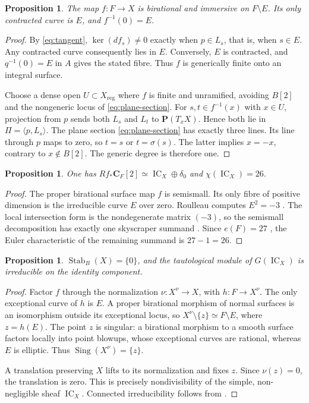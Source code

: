 \documentclass[10pt]{amsart}
\numberwithin{equation}{section}
\newtheorem{proposition}[theorem]{Proposition}
\theoremstyle{remark}
\newcommand{\CC}{\mathbf C}
\newcommand{\PP}{\mathbf P}
\newcommand{\IC}{\operatorname{IC}}
\newcommand{\Stab}{\operatorname{Stab}}
\newcommand{\Sing}{\operatorname{Sing}}
\newcommand{\reg}{\mathrm{reg}}
\begin{document}
\begin{proposition}\label{prop:birational}
The map $f:F\to X$ is birational and immersive on $F\setminus E$.
Its only contracted curve is $E$, and $f^{-1}(0)=E$.
\end{proposition}
\begin{proof}
By \eqref{eq:tangent}, $\ker(df_s)\ne0$ exactly when $p\in L_s$, that
is, when $s\in E$.  Any contracted curve consequently lies in $E$.
Conversely, $E$ is contracted, and $q^{-1}(0)=E$ in $A$ gives the stated
fibre.  Thus $f$ is generically finite onto an integral surface.

Choose a dense open $U\subset X_{\reg}$ where $f$ is finite and unramified,
avoiding $B[2]$ and the nongeneric locus of \eqref{eq:plane-section}.
For $s,t\in f^{-1}(x)$ with $x\in U$, projection from $p$ sends both
$L_s$ and $L_t$ to $\PP(T_xX)$.  Hence both lie in
$\Pi=\langle p,L_s\rangle$.  The plane section
\eqref{eq:plane-section} has exactly three lines.  Its line through $p$
maps to zero, so $t=s$ or $t=\sigma(s)$.  The latter implies
$x=-x$, contrary to $x\notin B[2]$.  The generic degree is therefore one.
\end{proof}

\begin{proposition}\label{prop:semismall}
One has $Rf_*\CC_F[2]\simeq\IC_X\oplus\delta_0$ and $\chi(\IC_X)=26$.
\end{proposition}
\begin{proof}
The proper birational surface map $f$ is semismall.  Its only fibre of
positive dimension is the irreducible curve $E$ over zero.
Roulleau computes $E^2=-3$ \cite[Proposition~10]{Roulleau2009}.
The local intersection form is the nondegenerate matrix $(-3)$, so the
semismall decomposition has exactly one skyscraper summand
\cite[Theorem~3.4.1]{deCM2002}.  Since $e(F)=27$ \cite{CG1972},
the Euler characteristic of the remaining summand is $27-1=26$.
\end{proof}

\begin{proposition}\label{prop:stabilizer}
$\Stab_B(X)=\{0\}$, and the tautological module of $G(\IC_X)$ is
irreducible on the identity component.
\end{proposition}
\begin{proof}
Factor $f$ through the normalization $\nu:X^\nu\to X$, with
$h:F\to X^\nu$.  The only exceptional curve of $h$ is $E$.  A proper
birational morphism of normal surfaces is an isomorphism outside its
exceptional locus, so $X^\nu\setminus\{z\}\simeq F\setminus E$, where
$z=h(E)$.  The point $z$ is singular: a birational morphism to a smooth
surface factors locally into point blowups, whose exceptional curves are
rational, whereas $E$ is elliptic.  Thus $\Sing(X^\nu)=\{z\}$.

A translation preserving $X$ lifts to its normalization and fixes $z$.
Since $\nu(z)=0$, the translation is zero.  This is precisely
nondivisibility of the simple, non-negligible sheaf $\IC_X$.
Connected irreducibility follows from
\cite[Proposition~3.3(2)]{JKLM2025}.
\end{proof}
\end{document}
